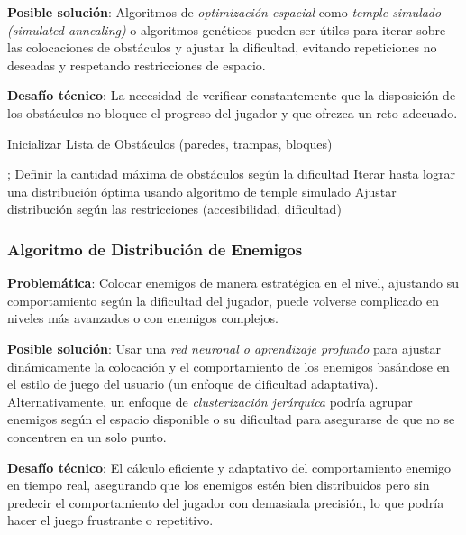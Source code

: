 \textbf{Posible solución}: Algoritmos de \textit{optimización espacial} como \textit{temple simulado (simulated annealing)} o algoritmos genéticos pueden ser útiles para iterar sobre las colocaciones de obstáculos y ajustar la dificultad, evitando repeticiones no deseadas y respetando restricciones de espacio.

\textbf{Desafío técnico}: La necesidad de verificar constantemente que la disposición de los obstáculos no bloquee el progreso del jugador y que ofrezca un reto adecuado.

\begin{algorithm}
\SetAlgoLined
\caption{Inicializar Lista de Obstáculos (paredes, trampas, bloques)};
Definir la cantidad máxima de obstáculos según la dificultad\;
Iterar hasta lograr una distribución óptima usando algoritmo de temple simulado\;
Ajustar distribución según las restricciones (accesibilidad, dificultad)\;
\end{algorithm}

\subsubsection*{Algoritmo de Distribución de Enemigos}

\textbf{Problemática}: Colocar enemigos de manera estratégica en el nivel, ajustando su comportamiento según la dificultad del jugador, puede volverse complicado en niveles más avanzados o con enemigos complejos.

\textbf{Posible solución}: Usar una \textit{red neuronal o aprendizaje profundo} para ajustar dinámicamente la colocación y el comportamiento de los enemigos basándose en el estilo de juego del usuario (un enfoque de dificultad adaptativa). Alternativamente, un enfoque de \textit{clusterización jerárquica} podría agrupar enemigos según el espacio disponible o su dificultad para asegurarse de que no se concentren en un solo punto.

\textbf{Desafío técnico}: El cálculo eficiente y adaptativo del comportamiento enemigo en tiempo real, asegurando que los enemigos estén bien distribuidos pero sin predecir el comportamiento del jugador con demasiada precisión, lo que podría hacer el juego frustrante o repetitivo.


